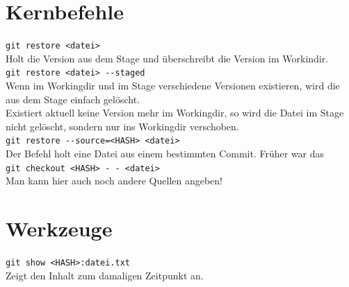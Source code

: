 \documentclass[oneside]{scrreprt}
\begin{document}
\section*{Kernbefehle}

\verb+git restore <datei>+\\
Holt die Version aus dem Stage und überschreibt die 
Version im Workindir.
~\\

\verb+git restore <datei> --staged+\\
Wenn im Workingdir und im Stage verschiedene Versionen
existieren, wird die aus dem Stage einfach gelöscht.\\

Existiert aktuell keine Version mehr im Workingdir, 
so wird die Datei im Stage nicht gelöscht, sondern nur
ins Workingdir verschoben.
~\\


\verb+git restore --source=<HASH> <datei>+\\
Der Befehl holt eine Datei aus einem bestimmten Commit.
Früher war das\\
 \texttt{git checkout <HASH> -\,- <datei>}\\
 Man kann hier auch noch andere Quellen angeben!


\section*{Werkzeuge}

\verb+git show <HASH>:datei.txt+\\
Zeigt den Inhalt zum damaligen Zeitpunkt an.
\end{document}
